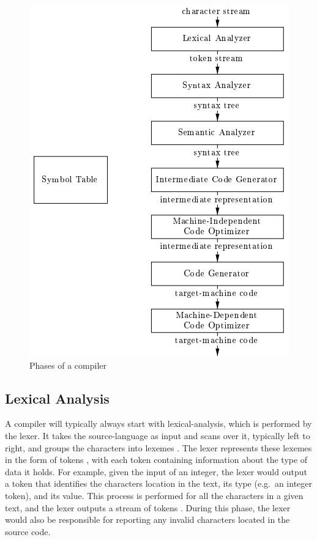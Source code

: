 \documentclass[
]{report}
\begin{document}
\begin{figure}
	\centering
	\includegraphics[width=\textwidth]{compiler-phases}
	\caption{Phases of a compiler \cite{dragon-book}}
	\label{fig:compiler-phases}
\end{figure}
\newpage

\subsection{Lexical Analysis}
A compiler will typically always start with \gls{lexical-analysis}, which is
performed by the lexer. It takes the \gls{source-language} as input and scans over
it, typically left to right, and groups the characters into \glspl{lexeme}
\cite{guru99-website}. The lexer represents these \glspl{lexeme} in the form of \glspl{token}
\cite{tutorials-guide}, with each \gls{token} containing information about the type of data
it holds. For example, given the input of an integer, the lexer would
output a \gls{token} that identifies the characters location in the text, its
type (e.g.~an integer \gls{token}), and its value. This process is performed
for all the characters in a given text, and the lexer outputs a stream
of \glspl{token} \cite{kttpro-website}. During this phase, the lexer would also be
responsible for reporting any invalid characters located in the source
code.
\end{document}
